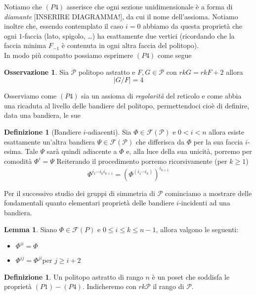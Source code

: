 \documentclass[a4paper,12pt]{report}
\newcommand{\p}{\mathcal{P}}
\theoremstyle{plain}
\theoremstyle{definition}
\newtheorem{defin}[teo]{Definizione}
\newtheorem{lem}[teo]{Lemma}
\newtheorem{oss}[teo]{Osservazione}
\begin{document}
Notiamo che $(P4)$ asserisce che ogni sezione unidimensionale \`e a forma di \emph{diamante} [INSERIRE DIAGRAMMA!], da cui il nome dell'assioma. Notiamo
inoltre che, essendo contemplato il caso $i=0$ abbiamo da questa propriet\`a che ogni $1$-faccia (lato, spigolo, \dots) ha esattamente due vertici 
(ricordando che la faccia
minima $F_{-1}$ \`e contenuta in ogni altra faccia del politopo).\\
In modo pi\`u compatto possiamo esprimere $(P4)$ come segue
\begin{oss}
Sia $\p$ politopo astratto e $F,G\in\p$ con $rkG = rkF + 2$ allora
\begin{equation*}
\left|G/F\right|=4
\end{equation*}
\end{oss}
Osserviamo come $(P4)$ sia un assioma di \emph{regolarit\`a} del reticolo e come abbia una ricaduta al livello delle bandiere del politopo,
permettendoci cio\`e di definire, data una bandiera, le sue

\begin{defin}[Bandiere $i$-adiacenti]
Sia $\Phi\in\mathcal{F}(\p)$ e $0<i<n$ allora esiste esattamente un'altra bandiera $\Psi\in\mathcal{F}(\p)$ che differisca da $\Phi$ per la sua faccia $i$-esima.
Tale $\Psi$ sar\`a quindi adiacente a $\Phi$ e, alla luce della sua unicit\`a, porremo per comodit\`a $\Phi^i=\Psi$
Reiterando il procedimento porremo ricorsivamente (per $k\geq 1$)
\begin{equation*}
\Phi^{i_1\cdots i_k i_{k+1}}=(\Phi^{(i_1\cdots i_k)})^{i_{k+1}}
\end{equation*}
\end{defin}
Per il successivo studio dei gruppi di simmetria di $\p$ cominciamo a mostrare delle fondamentali quanto elementari propriet\`a delle bandiere $i$-incidenti
ad una bandiera.

\begin{lem}
Siano $\Phi\in\mathcal{F}(P)$ e $0\leq i\leq k\leq n-1$, allora valgono le seguenti:
\begin{itemize}
\item $\Phi^{ii} = \Phi$
\item $\Phi^{ij} = \Phi^{ji}$\quad per $j\geq i+2$
\end{itemize}
\end{lem}

\begin{defin}
Un politopo astratto di rango $n$ \`e un poset che soddisfa le propriet\`a $(P1)-(P4)$. Indicheremo con $rk\p$ il rango di $\p$.
\end{defin}
\end{document}

